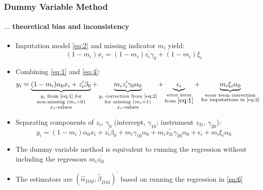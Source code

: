 \documentclass[aspectratio=1610]{beamer}
\begin{document}
\begin{frame}
	\frametitle{Dummy Variable Method}
	\framesubtitle{$\ldots$ theoretical bias and inconsistency}
	\begin{itemize}
		\item<1-> Imputation model \eqref{eq:2} and missing indicator $m_i$ yield:
		\begin{equation}\label{eq:4}
            (1-m_i)x_i = (1-m_i) z_i^{\prime} \gamma_0 + (1-m_i)\xi_i
        \end{equation}

		\item<2-> Combining \eqref{eq:1} and \eqref{eq:4}:
		\begin{equation}\label{eq:5}
            y_i = \underbrace{(1-m_i) \alpha_0 x_i + z_i^{\prime} \beta_0}_{\substack{
				y_i \text{ from \eqref{eq:1} for}\\
				\text{non-missing } (m_i = 0)\\
				x_i \text{-values}}} +
				\underbrace{m_i z_i^{\prime} \gamma_0 \alpha_0}_{\substack{
					y_i \text{ correction from \eqref{eq:2}}\\
					\text{for missing } (m_i = 1)\\
					x_i \text{-values}}} +
				\underbrace{\epsilon_i}_{\substack{
					\text{error term}\\
					\text{from } \eqref{eq:1}}} +
				\underbrace{m_i \xi_i \alpha_0}_{\substack{
					\text{error term correction}\\
					\text{for imputations in \eqref{eq:2}}}}
		\end{equation}

		\item<3-> Separating components of $z_i$, $\gamma_0$ (intercept, $\gamma_{10}$; instrument $z_{2i}$, $\gamma_{20}$):
		\begin{equation}\label{eq:6}
			y_i = (1-m_i) \alpha_0 x_i + z_i^{\prime} \beta_0 + m_i \gamma_{10} \alpha_0 + m_i z_{2i}^{\prime} \gamma_{20} \alpha_0 + \epsilon_i + m_i \xi_i \alpha_0
		\end{equation}
		\item<4-> The dummy variable method is equivalent to running the regression without including the regressors $m_i z_{2i}^{\prime}$
		\item<4-> The estimators are $(\hat{\alpha}_{DM}, \hat{\beta}_{DM})^{\prime}$ based on running the regression in \eqref{eq:6}
	\end{itemize}
\end{frame}
\end{document}
